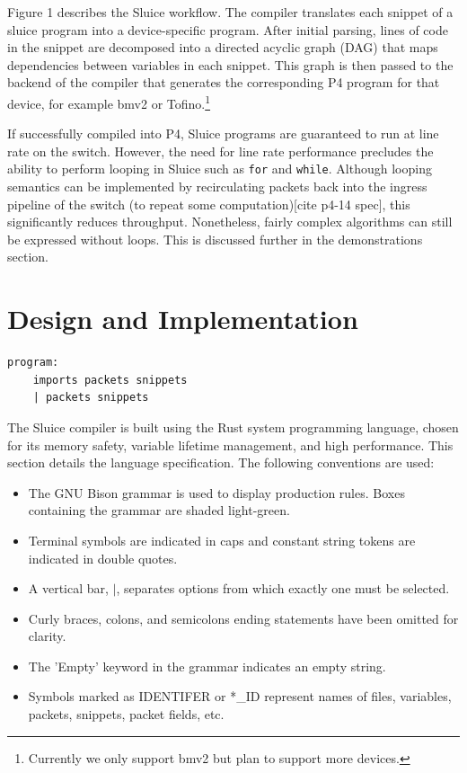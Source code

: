 \documentclass[12pt, oneside]{article}
\begin{document}
Figure 1 describes the Sluice workflow. The compiler translates each snippet of
a sluice program into a device-specific program. After initial parsing, lines
of code in the snippet are decomposed into a directed acyclic graph (DAG) that
maps dependencies between variables in each snippet. This graph is then passed
to the backend of the compiler that generates the corresponding P4 program for
that device, for example bmv2 or Tofino.\footnote{Currently we only support
bmv2 but plan to support more devices.} 

If successfully compiled into P4, Sluice programs are guaranteed to run at line rate on the switch. However, the need for line rate performance precludes the ability to perform looping in Sluice such as \texttt{for} and \texttt{while}. Although looping semantics can be implemented by recirculating packets back into the ingress pipeline of the switch (to repeat some computation)[cite p4-14 spec], this significantly reduces throughput. Nonetheless, fairly complex algorithms can still be expressed without loops. This is discussed further in the demonstrations section. 

\newpage
\section{Design and Implementation}

\begin{lstlisting}[basicstyle=\linespread{1.3}\scriptsize,  numberstyle=\tiny, backgroundcolor = \color{teagreen}, frame=tlrb]
program:
	imports packets snippets				
	| packets snippets
\end{lstlisting}

The Sluice compiler is built using the Rust system programming language, chosen for its memory safety, variable lifetime management, and high performance. This section details the language specification. The following conventions are used:

\begin{itemize}
  \item The GNU Bison grammar is used to display production rules. Boxes containing the grammar are shaded light-green.
  \item Terminal symbols are indicated in caps and constant string tokens are indicated in double quotes.
  \item A vertical bar, $|$, separates options from which exactly one must be selected.
  \item Curly braces, colons, and semicolons ending statements have been omitted for clarity.
  \item The 'Empty' keyword in the grammar indicates an empty string.
  \item Symbols marked as IDENTIFER or *\_ID represent names of files, variables, packets, snippets, packet fields, etc.
\end{itemize}
\end{document}
